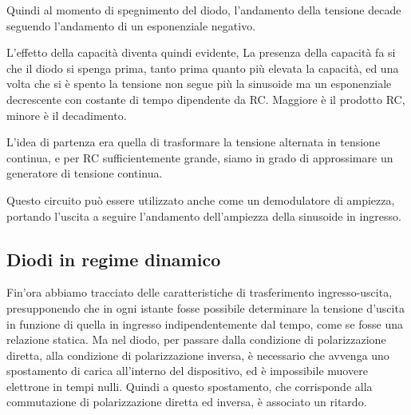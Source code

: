 \documentclass[../elettronica]{subfiles}
\begin{document}
\noindent Quindi al momento di spegnimento del diodo, l'andamento della tensione decade seguendo l'andamento di
un esponenziale negativo.

\begin{figure}[h]
    \centering
    \def\tf{5*180/8}

\end{figure}

\noindent L'effetto della capacità diventa quindi evidente,
La presenza della capacità fa si che il diodo si spenga prima, tanto prima quanto più elevata la capacità, ed una volta
che si è spento la tensione non segue più la sinusoide ma un esponenziale decrescente con costante di
tempo dipendente da RC. Maggiore è il prodotto RC, minore è il decadimento.

L'idea di partenza era quella di trasformare la tensione alternata in tensione continua, e per RC sufficientemente grande,
siamo in grado di approssimare un generatore di tensione continua.

Questo circuito può essere utilizzato anche come un demodulatore di ampiezza, portando l'uscita a seguire l'andamento
dell'ampiezza della sinusoide in ingresso.

\newpage
\subsection{Diodi in regime dinamico}
\label{sec:regime_dinamico}
Fin'ora abbiamo tracciato delle caratteristiche di trasferimento ingresso-uscita, presupponendo che in ogni istante
fosse possibile determinare la tensione d'uscita in funzione di quella in ingresso indipendentemente dal tempo, come
se fosse una relazione statica.
Ma nel diodo, per passare dalla condizione di polarizzazione diretta, alla condizione di polarizzazione inversa, è necessario
che avvenga uno spostamento di carica all'interno del dispositivo, ed è impossibile muovere elettrone in tempi nulli.
Quindi a questo spostamento, che corrisponde alla commutazione di polarizzazione diretta ed inversa, è associato un ritardo.
\end{document}
